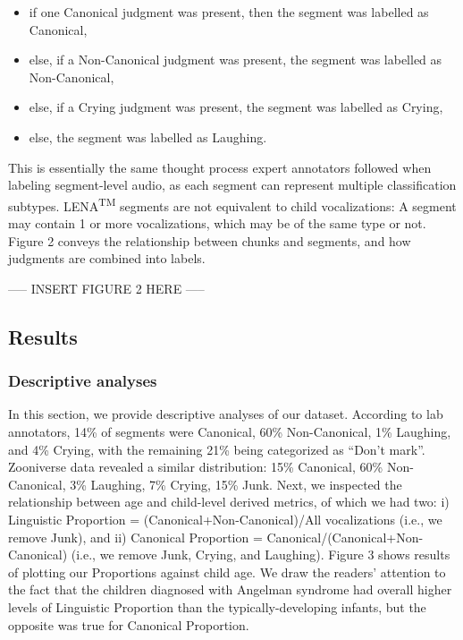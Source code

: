\documentclass[english,,man]{apa6}
\providecommand{\tightlist}{%
  \setlength{\itemsep}{0pt}\setlength{\parskip}{0pt}}
\begin{document}
\begin{itemize}
\tightlist
\item
  if one Canonical judgment was present, then the segment was labelled as Canonical,
\item
  else, if a Non-Canonical judgment was present, the segment was labelled as Non-Canonical,
\item
  else, if a Crying judgment was present, the segment was labelled as Crying,
\item
  else, the segment was labelled as Laughing.
\end{itemize}

This is essentially the same thought process expert annotators followed when labeling segment-level audio, as each segment can represent multiple classification subtypes. LENA\textsuperscript{TM} segments are not equivalent to child vocalizations: A segment may contain 1 or more vocalizations, which may be of the same type or not. Figure 2 conveys the relationship between chunks and segments, and how judgments are combined into labels.

----- INSERT FIGURE 2 HERE -----

\hypertarget{results}{%
\subsection{Results}\label{results}}

\hypertarget{descriptive-analyses}{%
\subsubsection{Descriptive analyses}\label{descriptive-analyses}}

In this section, we provide descriptive analyses of our dataset. According to lab annotators, 14\% of segments were Canonical, 60\% Non-Canonical, 1\% Laughing, and 4\% Crying, with the remaining 21\% being categorized as \enquote{Don't mark}. Zooniverse data revealed a similar distribution: 15\% Canonical, 60\% Non-Canonical, 3\% Laughing, 7\% Crying, 15\% Junk.
Next, we inspected the relationship between age and child-level derived metrics, of which we had two: i) Linguistic Proportion = (Canonical+Non-Canonical)/All vocalizations (i.e., we remove Junk), and ii) Canonical Proportion = Canonical/(Canonical+Non-Canonical) (i.e., we remove Junk, Crying, and Laughing). Figure 3 shows results of plotting our Proportions against child age. We draw the readers' attention to the fact that the children diagnosed with Angelman syndrome had overall higher levels of Linguistic Proportion than the typically-developing infants, but the opposite was true for Canonical Proportion.
\end{document}
